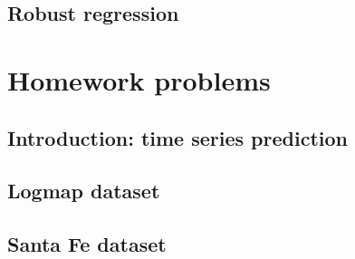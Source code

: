 \documentclass{article}
\begin{document}
    \subsection{Robust regression}
    
\section{Homework problems}
    \subsection{Introduction: time series prediction}
    
    \subsection{Logmap dataset}
    
    \subsection{Santa Fe dataset}
    
    
\end{document}

